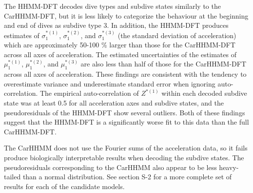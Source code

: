 The HHMM-DFT decodes dive types and subdive states similarly to the CarHHMM-DFT, but it is less likely to categorize the behaviour at the beginning and end of dives as subdive type 3. In addition, the HHMM-DFT produces estimates of $\sigma_1^{*(1)}$, $\sigma_1^{*(2)}$, and $\sigma_1^{*(3)}$ (the standard deviation of acceleration) which are approximately 50-100 \% larger than those for the CarHHMM-DFT across all axes of acceleration. The estimated uncertainties of the estimates of $\mu_1^{*(1)}$, $\mu_1^{*(2)}$, and $\mu_1^{*(3)}$ are also less than half of those for the CarHHMM-DFT across all axes of acceleration. These findings are consistent with the tendency to overestimate variance and underestimate standard error when ignoring auto-correlation. The empirical auto-correlation of $Z^{*(1)}$ within each decoded subdive state was at least 0.5 for all acceleration axes and subdive states, and the pseudoresiduals of the HHMM-DFT show several outliers. Both of these findings suggest that the HHMM-DFT is a significantly worse fit to this data than the full CarHHMM-DFT.

The CarHHMM does not use the Fourier sums of the acceleration data, so it fails produce biologically interpretable results when decoding the subdive states. The pseudoresiduals corresponding to the CarHHMM also appear to be less heavy-tailed than a normal distribution. See section S-2 for a more complete set of results for each of the candidate models.